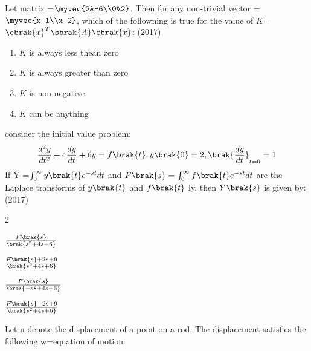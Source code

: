 \iffalse
\chapter{2017}
\author{AI24BTECH11004}
\section{ae}
\fi

       \item Let matrix =$\myvec{2&-6\\0&2}$. Then for any non-trivial vector =$\myvec{x_1\\x_2}$, which of the followning is true for the value of $K$=$\cbrak{x}^T\sbrak{A}\cbrak{x}$:
       \hfill{(2017)}
       \begin{enumerate}
           \item $K$ is always less thean zero 
           \item $K$ is always greater than zero
           \item $K$ is non-negative
           \item $K$ can be anything 
       \end{enumerate}
	\item consider the initial value problem:
        \begin{align*}
            \frac{d^2y}{dt^2}+4\frac{dy}{dt}+6y=f\brak{t}; y\brak{0}=2,\brak{\frac{dy}{dt}}_{t=0} =1
        \end{align*}
        If Y =$\int^\infty_0 y\brak{t}e^{-st}dt$ and $F\brak{s}=\int^\infty_0 f\brak{t}e^{-st}dt$ are the Laplace transforms of $y\brak{t}$ and $f\brak{t}$ ly, then $Y\brak{s}$ is given by:
        \hfill{(2017)}
               \begin{enumerate}
	       \end{enumerate}	
       \item Let u denote the displacement of a point on a rod. The displacement satisfies the following w=equation of motion:
